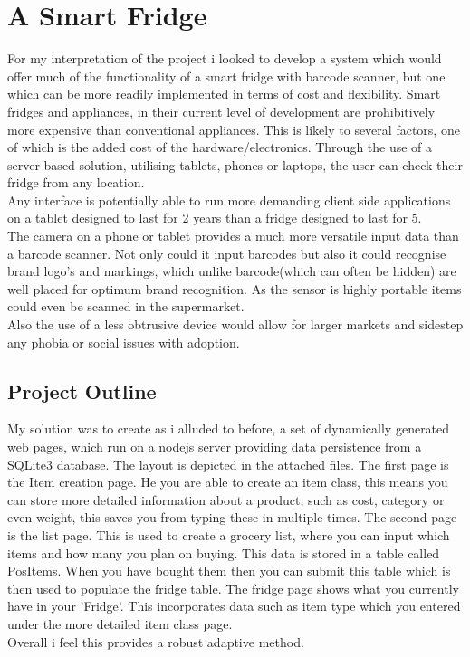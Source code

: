 \documentclass[12pt]{article}
\begin{document}
\section{A Smart Fridge}
For my interpretation of the project i looked to develop a system which would offer much of the functionality of a smart fridge with barcode scanner, but one which can be more readily implemented in terms of cost and flexibility. Smart fridges and appliances, in their current level of development are prohibitively more expensive than conventional appliances. This is likely to several factors, one of which is the added cost of the hardware/electronics. Through the use of a server based solution, utilising tablets, phones or laptops, the user can check their fridge from any location.\\ 
Any interface is potentially able to run more demanding client side applications on a tablet designed to last for 2 years than a fridge designed to last for 5.\\
The camera on a phone or tablet provides a much more versatile input data than a barcode scanner. Not only could it input barcodes but also it could recognise brand logo's and markings, which unlike barcode(which can often be hidden) are well placed for optimum brand recognition. As the sensor is highly portable items could even be scanned in the supermarket.\\
Also the use of a less obtrusive device would allow for larger markets and sidestep any phobia or social issues with adoption.\\
\subsection{Project Outline}
My solution was to create as i alluded to before, a set of dynamically generated web pages, which run on a nodejs server providing data persistence from a SQLite3 database. The layout is depicted in the attached files. The first page is the Item creation page. He you are able to create an item class, this means you can store more detailed information about a product, such as cost, category or even weight, this saves you from typing these in multiple times. The second page is the list page. This is used to create a grocery list, where you can input which items and how many you plan on buying. This data is stored in a table called PosItems. When you have bought them then you can submit this table which is then used to populate the fridge table. The fridge page shows what you currently have in your 'Fridge'. This incorporates data such as item type which you entered under the more detailed item class page. \\ Overall i feel this provides a robust adaptive method.
\end{document}
